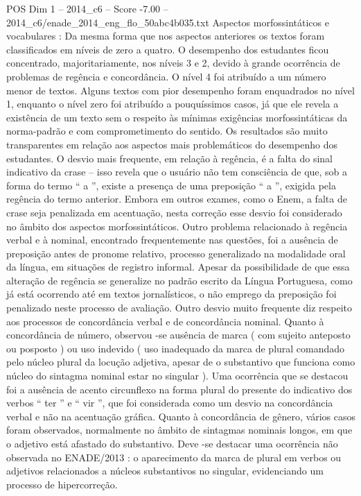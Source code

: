 \begin{textsample}{POS Dim 1 – 2014\_c6 – Score -7.00 – 2014\_c6/enade\_2014\_eng\_flo\_50abc4b035.txt}
Aspectos morfossintáticos e vocabulares : Da mesma forma que nos aspectos anteriores os textos foram classificados em níveis de zero a quatro.
O desempenho dos estudantes ficou concentrado, majoritariamente, nos níveis 3 e 2, devido à grande ocorrência de problemas de regência e concordância.
O nível 4 foi atribuído a um número menor de textos.
Alguns textos com pior desempenho foram enquadrados no nível 1, enquanto o nível zero foi atribuído a pouquíssimos casos, já que ele revela a existência de um texto sem o respeito às mínimas exigências morfossintáticas da norma-padrão e com comprometimento do sentido.
Os resultados são muito transparentes em relação aos aspectos mais problemáticos do desempenho dos estudantes.
O desvio mais frequente, em relação à regência, é a falta do sinal indicativo da crase – isso revela que o usuário não tem consciência de que, sob a forma do termo “ a ”, existe a presença de uma preposição “ a ”, exigida pela regência do termo anterior.
Embora em outros exames, como o Enem, a falta de crase seja penalizada em acentuação, nesta correção esse desvio foi considerado no âmbito dos aspectos morfossintáticos.
Outro problema relacionado à regência verbal e à nominal, encontrado frequentemente nas questões, foi a ausência de preposição antes de pronome relativo, processo generalizado na modalidade oral da língua, em situações de registro informal.
Apesar da possibilidade de que essa alteração de regência se generalize no padrão escrito da Língua Portuguesa, como já está ocorrendo até em textos jornalísticos, o não emprego da preposição foi penalizado neste processo de avaliação.
Outro desvio muito frequente diz respeito aos processos de concordância verbal e de concordância nominal.
Quanto à concordância de número, observou -se ausência de marca ( com sujeito anteposto ou posposto ) ou uso indevido ( uso inadequado da marca de plural comandado pelo núcleo plural da locução adjetiva, apesar de o substantivo que funciona como núcleo do sintagma nominal estar no singular ).
Uma ocorrência que se destacou foi a ausência de acento circunflexo na forma plural do presente do indicativo dos verbos “ ter ” e “ vir ”, que foi considerada como um desvio na concordância verbal e não na acentuação gráfica.
Quanto à concordância de gênero, vários casos foram observados, normalmente no âmbito de sintagmas nominais longos, em que o adjetivo está afastado do substantivo.
Deve -se destacar uma ocorrência não observada no ENADE/2013 : o aparecimento da marca de plural em verbos ou adjetivos relacionados a núcleos substantivos no singular, evidenciando um processo de hipercorreção.

\end{textsample}
